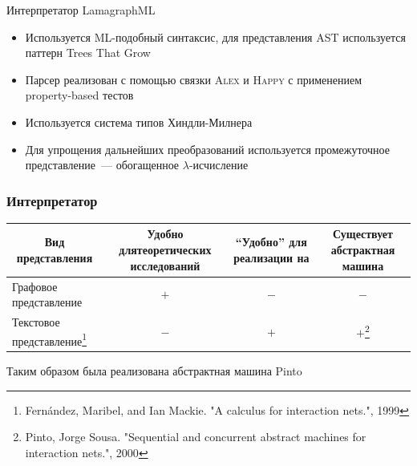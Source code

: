 \documentclass
  [ russian
  , aspectratio=169 %
  ] {beamer}
\begin{document}
\begin{frame}{Интерпретатор LamagraphML}

    \begin{itemize}
        \item Используется ML-подобный синтаксис, для представления AST используется паттерн Trees That Grow
        \item Парсер реализован с помощью связки \textsc{Alex} и \textsc{Happy} с применением property-based тестов
        \item Используется система типов Хиндли-Милнера
        \item Для упрощения дальнейших преобразований используется промежуточное представление~--- обогащенное $\lambda$-исчисление
    \end{itemize}

\end{frame}

\begin{frame}
    \frametitle{Интерпретатор \INs{}}

    \begin{center}
        \begin{tabular}{lccc}
            \toprule
            \multicolumn{1}{c}{Вид представления}
             & \multicolumn{1}{p{2.5cm}}{\raggedright Удобно для\newline теоретических исследований}
             & \multicolumn{1}{p{2.5cm}}{\raggedright \enquote{Удобно} для реализации на \Haskell{}}
             & \multicolumn{1}{p{2.1cm}}{\raggedright Существует абстрактная машина}                                              \\
            \midrule
            Графовое представление
             & $+$
             & $-$
             & $-$                                                                                                                \\
            Текстовое представление\footnote[frame]{Fernández, Maribel, and Ian Mackie. "A calculus for interaction nets.", 1999}
             & $-$
             & $+$
             & $+$\footnote[frame]{Pinto, Jorge Sousa. "Sequential and concurrent abstract machines for interaction nets.", 2000} \\
            \bottomrule
        \end{tabular}
    \end{center}

    \vspace{1em}

    Таким образом была реализована абстрактная машина Pinto

\end{frame}
\end{document}
